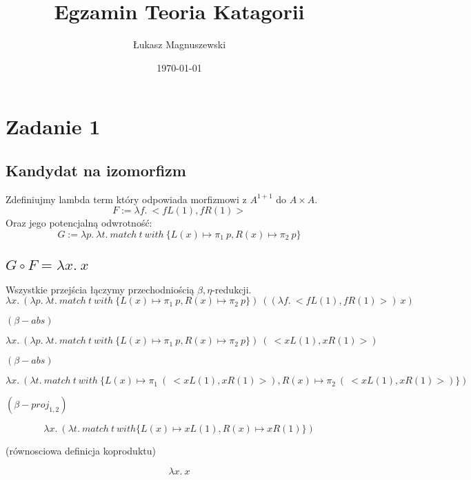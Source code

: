 \documentclass[11pt]{article}
\title{ Egzamin Teoria Katagorii}
\author{ Łukasz Magnuszewski }
\date{\today}
\begin{document}
\maketitle	
\pagebreak



\section{Zadanie 1}

\subsection{Kandydat na izomorfizm}
Zdefiniujmy lambda term który odpowiada morfizmowi z $A^{1 + 1}$ do $A \times A$.
\[
  F  := \lambda f. \ <f L(1), f R(1)>  
\]
Oraz jego potencjalną odwrotność:
\[
  G := \lambda p. \ \lambda t. \ match \ t \ with \ \{L(x) \mapsto \pi_1 \ p, R(x) \mapsto \pi_2 \ p\}
\]

\subsection{$G \circ F = \lambda x. \ x$}
Wszystkie przejścia łączymy przechodniością $\beta, \eta$-redukcji.
\[
   \lambda x. \ ( \lambda p. \ \lambda t. \ match \ t \ with \ \{L(x) \mapsto \pi_1 \ p, R(x) \mapsto \pi_2 \ p\}) \ (( \lambda f. \ <f L(1), f R(1)>  )\ x)
\]
\centerline{$(\beta - abs)$}
\[
   \lambda x. \ ( \lambda p. \ \lambda t. \ match \ t \ with \ \{L(x) \mapsto \pi_1 \ p, R(x) \mapsto \pi_2 \ p\}) \ (\ <x L(1), x R(1)>  )
\]
\centerline{$(\beta - abs)$}
\[
   \lambda x. \ (  \lambda t. \ match \ t \ with \ \{L(x) \mapsto \pi_1 \ (\ <x L(1), x R(1)>  ), R(x) \mapsto \pi_2 \ (\ <x L(1), x R(1)>  )\}) 
\]
\centerline{$(\beta - proj_{1,2})$}
\[
   \lambda x. \ (  \lambda t. \ match \ t \ with \{L(x) \mapsto x L(1), R(x) \mapsto x R(1) \} ) 
\]
\centerline{(równosciowa definicja koproduktu)}
\[
  \lambda x. \ x  
\]
\end{document}

